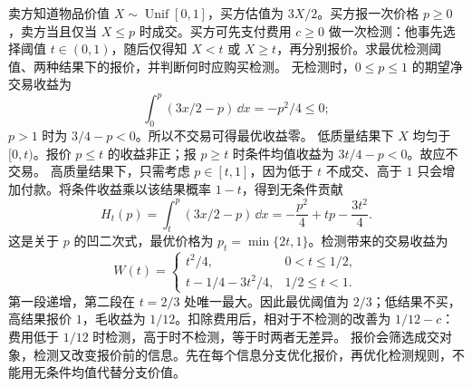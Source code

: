 卖方知道物品价值 $X\sim\operatorname{Unif}[0,1]$，买方估值为 $3X/2$。买方报一次价格 $p\ge0$，卖方当且仅当 $X\le p$ 时成交。买方可先支付费用 $c\ge0$ 做一次检测：他事先选择阈值 $t\in(0,1)$，随后仅得知 $X<t$ 或 $X\ge t$，再分别报价。求最优检测阈值、两种结果下的报价，并判断何时应购买检测。
\solution 无检测时，$0\le p\le1$ 的期望净交易收益为
\[
 \int_0^p(3x/2-p)\,\dd x=-p^2/4\le0;
\]
$p>1$ 时为 $3/4-p<0$。所以不交易可得最优收益零。
低质量结果下 $X$ 均匀于 $[0,t)$。报价 $p\le t$ 的收益非正；报 $p\ge t$ 时条件均值收益为 $3t/4-p<0$。故应不交易。
高质量结果下，只需考虑 $p\in[t,1]$，因为低于 $t$ 不成交、高于 $1$ 只会增加付款。将条件收益乘以该结果概率 $1-t$，得到无条件贡献
\[
 H_t(p)=\int_t^p(3x/2-p)\,\dd x
 =-\frac{p^2}{4}+tp-\frac{3t^2}{4}.
\]
这是关于 $p$ 的凹二次式，最优价格为 $p_t=\min\{2t,1\}$。检测带来的交易收益为
\[
 W(t)=\begin{cases}
 t^2/4,&0<t\le1/2,\\
 t-1/4-3t^2/4,&1/2\le t<1.
 \end{cases}
\]
第一段递增，第二段在 $t=2/3$ 处唯一最大。因此最优阈值为 $2/3$；低结果不买，高结果报价 $1$，毛收益为 $1/12$。扣除费用后，相对于不检测的改善为 $1/12-c$：费用低于 $1/12$ 时检测，高于时不检测，等于时两者无差异。
\insight 报价会筛选成交对象，检测又改变报价前的信息。先在每个信息分支优化报价，再优化检测规则，不能用无条件均值代替分支价值。
